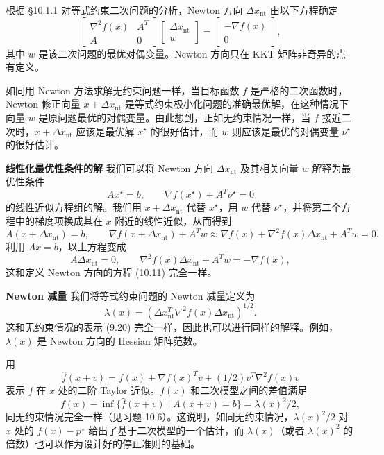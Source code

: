 \documentclass[UTF8, 12pt, fontset=fandol, oneside]{ctexart}
\begin{document}
根据 \S10.1.1 对等式约束二次问题的分析，Newton 方向 $\Delta x_{\mathrm{nt}}$ 由以下方程确定
\begin{equation}
\begin{bmatrix}
\nabla^2 f(x) & A^T\\
A & 0
\end{bmatrix}
\begin{bmatrix}
\Delta x_{\mathrm{nt}}\\
w
\end{bmatrix}
=
\begin{bmatrix}
-\nabla f(x)\\
0
\end{bmatrix},
\tag{10.11}
\end{equation}
其中 $w$ 是该二次问题的最优对偶变量。Newton 方向只在 KKT 矩阵非奇异的点有定义。

如同用 Newton 方法求解无约束问题一样，当目标函数 $f$ 是严格的二次函数时，Newton 修正向量 $x+\Delta x_{\mathrm{nt}}$ 是等式约束极小化问题的准确最优解，在这种情况下向量 $w$ 是原问题最优的对偶变量。由此想到，正如无约束情况一样，当 $f$ 接近二次时，$x+\Delta x_{\mathrm{nt}}$ 应该是最优解 $x^\star$ 的很好估计，而 $w$ 则应该是最优的对偶变量 $\nu^\star$ 的很好估计。

\noindent\textbf{线性化最优性条件的解}\quad
我们可以将 Newton 方向 $\Delta x_{\mathrm{nt}}$ 及其相关向量 $w$ 解释为最优性条件
\[
Ax^\star=b,\qquad \nabla f(x^\star)+A^T\nu^\star=0
\]
的线性近似方程组的解。我们用 $x+\Delta x_{\mathrm{nt}}$ 代替 $x^\star$，用 $w$ 代替 $\nu^\star$，并将第二个方程中的梯度项换成其在 $x$ 附近的线性近似，从而得到
\[
A(x+\Delta x_{\mathrm{nt}})=b,\qquad
\nabla f(x+\Delta x_{\mathrm{nt}})+A^Tw\approx
\nabla f(x)+\nabla^2 f(x)\Delta x_{\mathrm{nt}}+A^Tw=0.
\]
利用 $Ax=b$，以上方程变成
\[
A\Delta x_{\mathrm{nt}}=0,\qquad
\nabla^2 f(x)\Delta x_{\mathrm{nt}}+A^Tw=-\nabla f(x),
\]
这和定义 Newton 方向的方程 (10.11) 完全一样。

\noindent\textbf{Newton 减量}\quad
我们将等式约束问题的 Newton 减量定义为
\begin{equation}
\lambda(x)=\left(\Delta x_{\mathrm{nt}}^T\nabla^2 f(x)\Delta x_{\mathrm{nt}}\right)^{1/2}.
\tag{10.12}
\end{equation}
这和无约束情况的表示 (9.20) 完全一样，因此也可以进行同样的解释。例如，$\lambda(x)$ 是 Newton 方向的 Hessian 矩阵范数。

用
\[
\hat{f}(x+v)=f(x)+\nabla f(x)^Tv+(1/2)v^T\nabla^2 f(x)v
\]
表示 $f$ 在 $x$ 处的二阶 Taylor 近似。$f(x)$ 和二次模型之间的差值满足
\begin{equation}
f(x)-\inf\{\hat{f}(x+v)\mid A(x+v)=b\}=\lambda(x)^2/2,
\tag{10.13}
\end{equation}
同无约束情况完全一样（见习题 10.6）。这说明，如同无约束情况，$\lambda(x)^2/2$ 对 $x$ 处的 $f(x)-p^\star$ 给出了基于二次模型的一个估计，而 $\lambda(x)$（或者 $\lambda(x)^2$ 的倍数）也可以作为设计好的停止准则的基础。
\end{document}
